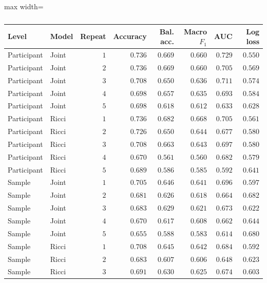 \begin{table}[!htbp]
\centering\small
\caption{}
\label{tab:joint-v8-all-repetitions}
\begingroup\bfseries\boldmath
\begin{adjustbox}{max width=\linewidth}
\begin{tabular}{llrrrrrr}
\toprule
Level & Model & Repeat & Accuracy & Bal. acc. & Macro $F_1$ & AUC & Log loss \\
\midrule
Participant & Joint & $1$ & $0.736$ & $0.669$ & $0.660$ & $0.729$ & $0.550$ \\
Participant & Joint & $2$ & $0.736$ & $0.669$ & $0.660$ & $0.705$ & $0.569$ \\
Participant & Joint & $3$ & $0.708$ & $0.650$ & $0.636$ & $0.711$ & $0.574$ \\
Participant & Joint & $4$ & $0.698$ & $0.657$ & $0.635$ & $0.693$ & $0.584$ \\
Participant & Joint & $5$ & $0.698$ & $0.618$ & $0.612$ & $0.633$ & $0.628$ \\
Participant & Ricci & $1$ & $0.736$ & $0.682$ & $0.668$ & $0.705$ & $0.561$ \\
Participant & Ricci & $2$ & $0.726$ & $0.650$ & $0.644$ & $0.677$ & $0.580$ \\
Participant & Ricci & $3$ & $0.708$ & $0.663$ & $0.643$ & $0.697$ & $0.580$ \\
Participant & Ricci & $4$ & $0.670$ & $0.561$ & $0.560$ & $0.682$ & $0.579$ \\
Participant & Ricci & $5$ & $0.689$ & $0.586$ & $0.585$ & $0.592$ & $0.641$ \\
Sample & Joint & $1$ & $0.705$ & $0.646$ & $0.641$ & $0.696$ & $0.597$ \\
Sample & Joint & $2$ & $0.681$ & $0.626$ & $0.618$ & $0.664$ & $0.682$ \\
Sample & Joint & $3$ & $0.683$ & $0.629$ & $0.621$ & $0.673$ & $0.622$ \\
Sample & Joint & $4$ & $0.670$ & $0.617$ & $0.608$ & $0.662$ & $0.644$ \\
Sample & Joint & $5$ & $0.655$ & $0.588$ & $0.583$ & $0.614$ & $0.680$ \\
Sample & Ricci & $1$ & $0.708$ & $0.645$ & $0.642$ & $0.684$ & $0.592$ \\
Sample & Ricci & $2$ & $0.683$ & $0.607$ & $0.606$ & $0.648$ & $0.623$ \\
Sample & Ricci & $3$ & $0.691$ & $0.630$ & $0.625$ & $0.674$ & $0.603$ \\

\end{tabular}
\end{adjustbox}
\end{table}
